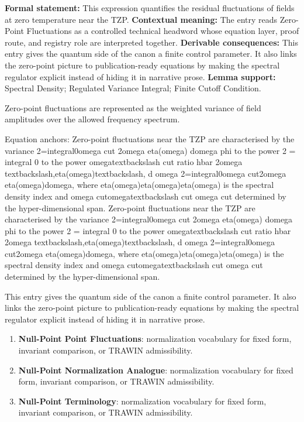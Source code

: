 \begingroup\footnotesize\setlength{\emergencystretch}{3em}\sloppy
\textbf{Formal statement:} This expression quantifies the residual fluctuations of fields at zero temperature near the TZP. \textbf{Contextual meaning:} The entry reads Zero-Point Fluctuations as a controlled technical headword whose equation layer, proof route, and registry role are interpreted together. \textbf{Derivable consequences:} This entry gives the quantum side of the canon a finite control parameter. It also links the zero-point picture to publication-ready equations by making the spectral regulator explicit instead of hiding it in narrative prose. \textbf{Lemma support:} Spectral Density; Regulated Variance Integral; Finite Cutoff Condition.\par
\endgroup

Zero-point fluctuations are represented as the weighted variance of field amplitudes over the allowed frequency spectrum.

Equation anchors: Zero-point fluctuations near the TZP are characterised by the variance  2=integral0omega cut 2omega eta(omega) domega phi to the power 2 = integral 0 to the power omegatextbackslash cut ratio hbar 2omega textbackslash,eta(omega)textbackslash, d omega 2=integral0omega cut2omega eta(omega)domega, where eta(omega)eta(omega)eta(omega) is the spectral density index and omega cutomegatextbackslash cut omega cut determined by the hyper-dimensional span. Zero-point fluctuations near the TZP are characterised by the variance  2=integral0omega cut 2omega eta(omega) domega phi to the power 2 = integral 0 to the power omegatextbackslash cut ratio hbar 2omega textbackslash,eta(omega)textbackslash, d omega 2=integral0omega cut2omega eta(omega)domega, where eta(omega)eta(omega)eta(omega) is the spectral density index and omega cutomegatextbackslash cut omega cut determined by the hyper-dimensional span.

This entry gives the quantum side of the canon a finite control parameter. It also links the zero-point picture to publication-ready equations by making the spectral regulator explicit instead of hiding it in narrative prose.
\endgroup

\begingroup\footnotesize\sloppy
\begin{enumerate}[leftmargin=1.35em,itemsep=1pt,topsep=1pt,parsep=0pt]
\item \textbf{Null-Point Point Fluctuations}: normalization vocabulary for fixed form, invariant comparison, or TRAWIN admissibility.
\item \textbf{Null-Point Normalization Analogue}: normalization vocabulary for fixed form, invariant comparison, or TRAWIN admissibility.
\item \textbf{Null-Point Terminology}: normalization vocabulary for fixed form, invariant comparison, or TRAWIN admissibility.
\end{enumerate}
\endgroup

